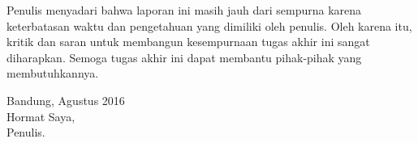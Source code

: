 Penulis menyadari bahwa laporan ini masih jauh dari sempurna karena keterbatasan waktu dan pengetahuan yang dimiliki oleh penulis. Oleh karena itu, kritik dan saran untuk membangun kesempurnaan tugas akhir ini sangat diharapkan. Semoga tugas akhir ini dapat membantu pihak-pihak yang membutuhkannya.\\[1.5cm]  
\hfill
{\begin{flushright} Bandung, Agustus 2016\\[1.5cm] Hormat  Saya,\\ Penulis.\end{flushright}}
\newpage